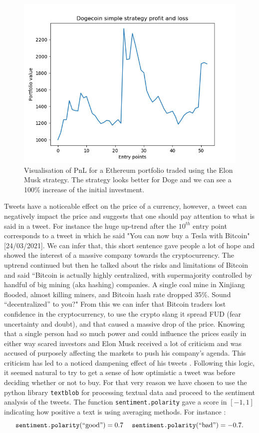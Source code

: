\documentclass[twoside]{report}
\newcommand{\code}{\texttt}
\begin{document}
\begin{spacing}{1}
\begin{figure}[!htbp]
    \centering
    \includegraphics[scale = 0.5]{TestPlots/plot-DOGE-pnl.png}
    \caption{Visualisation of PnL for a Ethereum portfolio traded using the Elon Musk strategy. The strategy looks better for Doge and we can see a 100\% increase of the initial investment.}
    \label{fig:elon_doge_pnl}
\end{figure}
Tweets have a noticeable effect on the price of a currency, however, a tweet can negatively impact the price and suggests that one should pay attention to what is said in a tweet. For instance the huge up-trend after the $10^{th}$ entry point corresponds to a tweet in which he said "You can now buy a Tesla with Bitcoin" [24/03/2021]. We can infer that, this short sentence gave people a lot of hope and showed the interest of a massive company towards the cryptocurrency. The uptrend continued but then he talked about the risks and limitations of Bitcoin and said ``Bitcoin is actually highly centralized, with supermajority controlled by handful of big mining (aka hashing) companies. A single coal mine in Xinjiang flooded, almost killing miners, and Bitcoin hash rate dropped 35\%. Sound “decentralized” to you?" %
From this we can infer that Bitcoin traders lost confidence in the cryptocurrency, to use the crypto slang it spread FUD (fear uncertainty and doubt), and that caused a massive drop of the price. Knowing that a single person had so much power and could influence the prices easily in either way scared investors and Elon Musk received a lot of criticism and was accused of purposely affecting the markets to push his company's agenda. This criticism has led to a noticed dampening effect of his tweets \cite{ElonCriticism}. Following this logic, it seemed natural to try to get a sense of how optimistic a tweet was before deciding whether or not to buy. For that very reason we have chosen to use the python library \code{textblob} \cite{loria2018textblob} for processing textual data and proceed to the sentiment analysis of the tweets. The function \code{sentiment.polarity} gave a score in $ [-1,1]$ indicating how positive a text is using averaging methods. For instance : \[\code{sentiment.polarity}(``\text{good}")=0.7\;\;\;\:\:\code{sentiment.polarity}(``\text{bad}")=-0.7.\]

\end{spacing}
\end{document}
